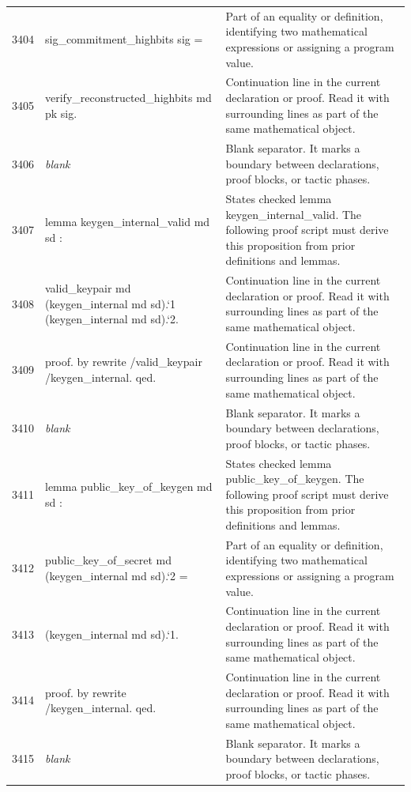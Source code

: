 \documentclass[10pt]{article}
\begin{document}
\begin{longtable}{r L{0.53\textwidth} L{0.37\textwidth}}
3404 & {\ttfamily\scriptsize   sig\_commitment\_highbits sig =} & Part of an equality or definition, identifying two mathematical expressions or assigning a program value. \\
3405 & {\ttfamily\scriptsize     verify\_reconstructed\_highbits md pk sig.} & Continuation line in the current declaration or proof.  Read it with surrounding lines as part of the same mathematical object. \\
3406 & {\ttfamily\scriptsize \emph{blank}} & Blank separator.  It marks a boundary between declarations, proof blocks, or tactic phases. \\
3407 & {\ttfamily\scriptsize lemma keygen\_internal\_valid md sd :} & States checked lemma keygen\_internal\_valid.  The following proof script must derive this proposition from prior definitions and lemmas. \\
3408 & {\ttfamily\scriptsize   valid\_keypair md (keygen\_internal md sd).`1 (keygen\_internal md sd).`2.} & Continuation line in the current declaration or proof.  Read it with surrounding lines as part of the same mathematical object. \\
3409 & {\ttfamily\scriptsize proof. by rewrite /valid\_keypair /keygen\_internal. qed.} & Continuation line in the current declaration or proof.  Read it with surrounding lines as part of the same mathematical object. \\
3410 & {\ttfamily\scriptsize \emph{blank}} & Blank separator.  It marks a boundary between declarations, proof blocks, or tactic phases. \\
3411 & {\ttfamily\scriptsize lemma public\_key\_of\_keygen md sd :} & States checked lemma public\_key\_of\_keygen.  The following proof script must derive this proposition from prior definitions and lemmas. \\
3412 & {\ttfamily\scriptsize   public\_key\_of\_secret md (keygen\_internal md sd).`2 =} & Part of an equality or definition, identifying two mathematical expressions or assigning a program value. \\
3413 & {\ttfamily\scriptsize   (keygen\_internal md sd).`1.} & Continuation line in the current declaration or proof.  Read it with surrounding lines as part of the same mathematical object. \\
3414 & {\ttfamily\scriptsize proof. by rewrite /keygen\_internal. qed.} & Continuation line in the current declaration or proof.  Read it with surrounding lines as part of the same mathematical object. \\
3415 & {\ttfamily\scriptsize \emph{blank}} & Blank separator.  It marks a boundary between declarations, proof blocks, or tactic phases. \\

\end{longtable}
\end{document}
